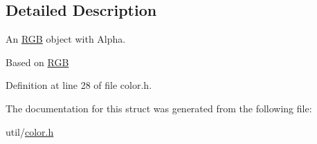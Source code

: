 \subsection{Detailed Description}
An \hyperlink{struct_triton_1_1_util_1_1_r_g_b}{R\+G\+B} object with Alpha. 

Based on \hyperlink{struct_triton_1_1_util_1_1_r_g_b}{R\+G\+B} 

Definition at line 28 of file color.\+h.



The documentation for this struct was generated from the following file\+:\begin{DoxyCompactItemize}
\item 
util/\hyperlink{color_8h}{color.\+h}\end{DoxyCompactItemize}
